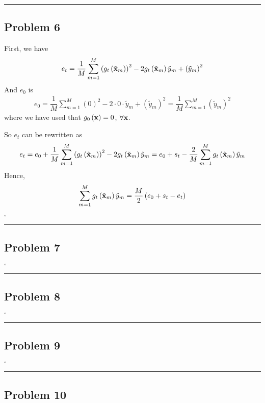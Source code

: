 \documentclass[12pt]{article}
\newcommand*{\QEDB}{\hfill\ensuremath{\square}}
\newcommand{\ParTh}[1]{\left(#1\right)}
\newcommand{\BF}[1]{{\bf#1}}
\newcommand{\horrule}[1]{\rule{\linewidth}{#1}}
\begin{document}
\horrule{0.5pt}

\subsection*{Problem 6}

First, we have
\begin{align}
e_t=\dfrac{1}{M}\sum_{m=1}^{M}\ParTh{g_t\ParTh{\tilde{\BF{x}}_m}}^2-2g_t\ParTh{\tilde{\BF{x}}_m}\tilde{y}_m+\ParTh{\tilde{y}_m}^2
\end{align}
And $e_0$ is
\begin{align}
e_0=\dfrac{1}{M}\sum_{m=1}^{M}\ParTh{0}^2-2\cdot0\cdot\tilde{y}_m+\ParTh{\tilde{y}_m}^2=\dfrac{1}{M}\sum_{m=1}^{M}\ParTh{\tilde{y}_m}^2
\end{align}
where we have used that $g_0\ParTh{\BF{x}}=0$, $\forall\BF{x}$.

So $e_t$ can be rewritten as
\begin{align}
e_t=e_0+\dfrac{1}{M}\sum_{m=1}^{M}\ParTh{g_t\ParTh{\tilde{\BF{x}}_m}}^2-2g_t\ParTh{\tilde{\BF{x}}_m}\tilde{y}_m=e_0+s_t-\dfrac{2}{M}\sum_{m=1}^{M}g_t\ParTh{\tilde{\BF{x}}_m}\tilde{y}_m
\end{align}
Hence,
\begin{align}
\sum_{m=1}^{M}g_t\ParTh{\tilde{\BF{x}}_m}\tilde{y}_m=\dfrac{M}{2}\ParTh{e_0+s_t-e_t}
\end{align}

\QEDB

\horrule{0.5pt}

\subsection*{Problem 7}

\QEDB

\horrule{0.5pt}

\subsection*{Problem 8}

\QEDB

\horrule{0.5pt}

\subsection*{Problem 9}

\QEDB

\horrule{0.5pt}

\subsection*{Problem 10}
\end{document}
